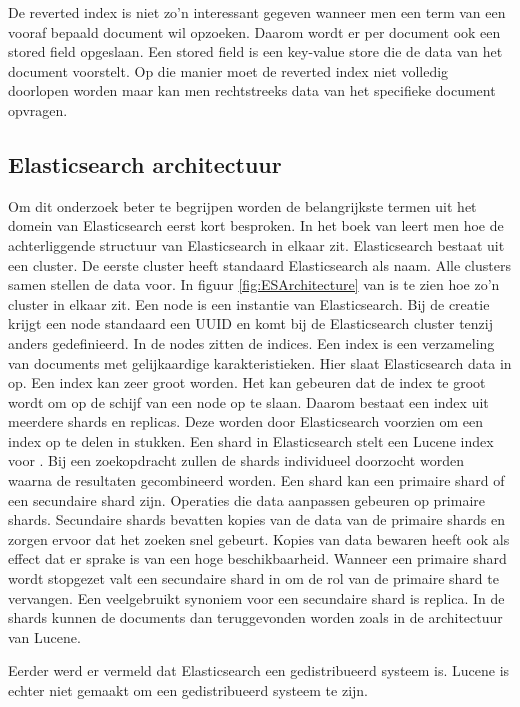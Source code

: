 De reverted index is niet zo'n interessant gegeven wanneer men een term van een vooraf bepaald document wil opzoeken. Daarom wordt er per document ook een stored field opgeslaan. Een stored field is een key-value store die de data van het document voorstelt. Op die manier moet de reverted index niet volledig doorlopen worden maar kan men rechtstreeks data van het specifieke document opvragen.

\subsection{Elasticsearch architectuur}
\label{architectuur}


Om dit onderzoek beter te begrijpen worden de belangrijkste termen uit het domein van Elasticsearch eerst kort besproken. In het boek van \textcite{Dixit2016} leert men hoe de achterliggende structuur van Elasticsearch in elkaar zit. Elasticsearch bestaat uit een cluster. De eerste cluster heeft standaard Elasticsearch als naam. Alle clusters samen stellen de data voor. In figuur \ref{fig:ESArchitecture} van \textcite{Babaev2013} is te zien hoe zo'n cluster in elkaar zit. Een node is een instantie van Elasticsearch. Bij de creatie krijgt een node standaard een UUID en komt bij de Elasticsearch cluster tenzij anders gedefinieerd. In de nodes zitten de indices. Een index is een verzameling van documents met gelijkaardige karakteristieken. Hier slaat Elasticsearch data in op. Een index kan zeer groot worden. Het kan gebeuren dat de index te groot wordt om op de schijf van een node op te slaan. Daarom bestaat een index uit meerdere shards en replicas. Deze worden door Elasticsearch voorzien om een index op te delen in stukken. Een shard in Elasticsearch stelt een Lucene index voor \autocite{Brasetvik2017}. Bij een zoekopdracht zullen de shards individueel doorzocht worden waarna de resultaten gecombineerd worden. Een shard kan een primaire shard of een secundaire shard zijn. Operaties die data aanpassen gebeuren op primaire shards. Secundaire shards bevatten kopies van de data van de primaire shards en zorgen ervoor dat het zoeken snel gebeurt. Kopies van data bewaren heeft ook als effect dat er sprake is van een hoge beschikbaarheid. Wanneer een primaire shard wordt stopgezet valt een secundaire shard in om de rol van de primaire shard te vervangen. Een veelgebruikt synoniem voor een secundaire shard is replica. In de shards kunnen de documents dan teruggevonden worden zoals in de architectuur van Lucene.

Eerder werd er vermeld dat Elasticsearch een gedistribueerd systeem is. Lucene is echter niet gemaakt om een gedistribueerd systeem te zijn.

